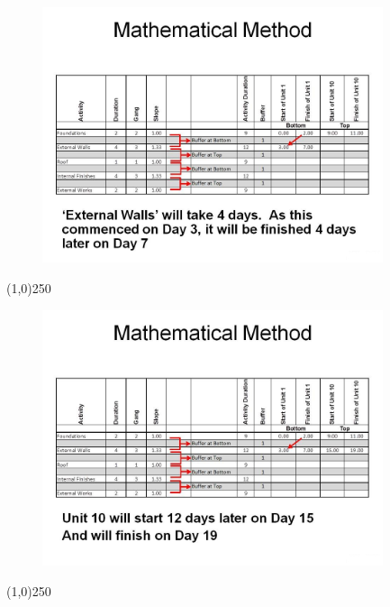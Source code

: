 \begin{frame}
\begin{figure}
	\centering
		\includegraphics[width = 10.0cm]{oldnotes/Slide287.jpg}
\end{figure}
\end{frame}
\begin{center}\line(1,0){250}\end{center}






\begin{frame}
\begin{figure}
	\centering
		\includegraphics[width = 10.0cm]{oldnotes/Slide288.jpg}
\end{figure}
\end{frame}
\begin{center}\line(1,0){250}\end{center}






